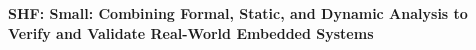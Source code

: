 \documentclass[11pt]{article}
\begin{document}
\begin{center}
  \Large\bf SHF: Small: Combining Formal, Static, and
  Dynamic Analysis to Verify and Validate Real-World Embedded Systems
\end{center}














\newpage
\setcounter{page}{1}



\end{document}

